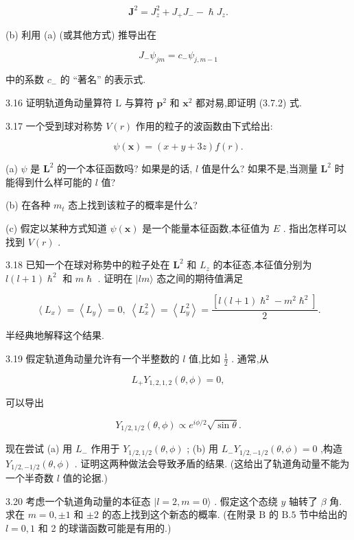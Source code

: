 $$
{\mathbf{J}}^{2} = {J}_{z}^{2} + {J}_{ + }{J}_{ - } - \hslash {J}_{z}.
$$

(b) 利用 (a) (或其他方式) 推导出在

$$
{J}_{ - }{\psi }_{jm} = {c}_{ - }{\psi }_{j, m - 1}
$$

中的系数 ${c}_{ - }$ 的 “著名” 的表示式.

3.16 证明轨道角动量算符 $\mathrm{L}$ 与算符 ${\mathbf{p}}^{2}$ 和 ${\mathbf{x}}^{2}$ 都对易,即证明 (3.7.2) 式.

3.17 一个受到球对称势 $V\left( r\right)$ 作用的粒子的波函数由下式给出:

$$
\psi \left( \mathbf{x}\right) = \left( {x + y + {3z}}\right) f\left( r\right) .
$$

(a) $\psi$ 是 ${\mathbf{L}}^{2}$ 的一个本征函数吗? 如果是的话, $l$ 值是什么? 如果不是,当测量 ${\mathbf{L}}^{2}$ 时能得到什么样可能的 $l$ 值?

(b) 在各种 ${m}_{t}$ 态上找到该粒子的概率是什么?

(c) 假定以某种方式知道 $\psi \left( \mathbf{x}\right)$ 是一个能量本征函数,本征值为 $E$ . 指出怎样可以找到 $V\left( r\right)$ .

3.18 已知一个在球对称势中的粒子处在 ${\mathbf{L}}^{2}$ 和 ${L}_{z}$ 的本征态,本征值分别为 $l\left( {l + 1}\right) {\hslash }^{2}$ 和 $m\hslash$ . 证明在 $|{lm}\rangle$ 态之间的期待值满足

$$
\left\langle {L}_{x}\right\rangle = \left\langle {L}_{y}\right\rangle = 0,\;\left\langle {L}_{x}^{2}\right\rangle = \left\langle {L}_{y}^{2}\right\rangle = \frac{\left\lbrack l\left( l + 1\right) {\hslash }^{2} - {m}^{2}{\hslash }^{2}\right\rbrack }{2}.
$$

半经典地解释这个结果.

3.19 假定轨道角动量允许有一个半整数的 $l$ 值,比如 $\frac{1}{2}$ . 通常,从

$$
{L}_{ + }{Y}_{1,2,1,2}\left( {\theta ,\phi }\right) = 0,
$$

可以导出

$$
{Y}_{1/2,1/2}\left( {\theta ,\phi }\right) \propto {e}^{{i\phi }/2}\sqrt{\sin \theta }.
$$

现在尝试 (a) 用 ${L}_{ - }$ 作用于 ${Y}_{1/2,1/2}\left( {\theta ,\phi }\right)$ ; (b) 用 ${L}_{ - }{Y}_{1/2, - 1/2}\left( {\theta ,\phi }\right) = 0$ ,构造 ${Y}_{1/2, - 1/2}\left( {\theta ,\phi }\right)$ . 证明这两种做法会导致矛盾的结果. (这给出了轨道角动量不能为一个半奇数 $l$ 值的论据.)

3.20 考虑一个轨道角动量的本征态 $|l = 2, m = 0\rangle$ . 假定这个态绕 $y$ 轴转了 $\beta$ 角. 求在 $m = 0, \pm 1$ 和 $\pm 2$ 的态上找到这个新态的概率. (在附录 $\mathrm{B}$ 的 $\mathrm{B}{.5}$ 节中给出的 $l = 0,1$ 和 2 的球谐函数可能是有用的.)

